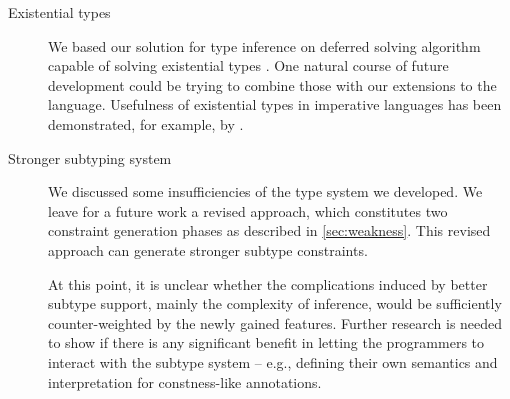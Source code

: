 \begin{description}
    \item[Existential types] We based our solution for type inference on deferred solving algorithm capable of solving existential types \cite{vytiniotis2011outsidein}. One natural course of future development could be trying to combine those with our extensions to the language. Usefulness of existential types in imperative languages has been demonstrated, for example, by \citet{grossman2002existential}.

    \item[Stronger subtyping system] We discussed some insufficiencies of the type system we developed. We leave for a future work a revised approach, which constitutes two constraint generation phases as described in \cref{sec:weakness}. This revised approach can generate stronger subtype constraints.

    At this point, it is unclear whether the complications induced by better subtype support, mainly the complexity of inference, would be sufficiently counter-weighted by the newly gained features. Further research is needed to show if there is any significant benefit in letting the programmers to interact with the subtype system -- e.g., defining their own semantics and interpretation for constness-like annotations.
\end{description}
